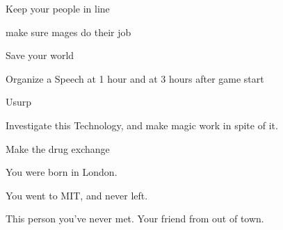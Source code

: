 \documentclass[char]{guildcamp3}
\begin{document}
\begin{itemz}[Goals]
  \item Keep your people in line
  \item make sure mages do their job
  \item Save your world
  \item Organize a Speech at 1 hour and at 3 hours after game start
  \item Usurp \cNobleOne{}
  \item Investigate this Technology, and make magic work in spite of it.
  \item Make the drug exchange
\end{itemz}

\begin{itemz}[Notes]
  \item You were born in London.
  \item You went to MIT, and never left.
\end{itemz}


\begin{contacts}
  \contact{\cNPC{}} This person you've never met.
  \contact{\cSomeGuy{}} Your friend from out of town.
\end{contacts}
\end{document}
